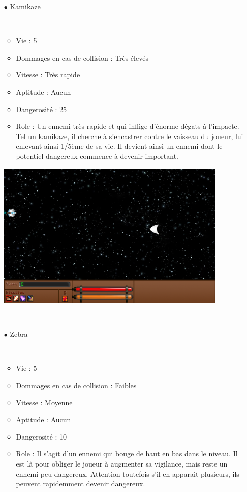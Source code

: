 \begin{itemize}
				\par~
			\item[$\bullet$ Kamikaze]
				\par~
				\begin{itemize}			
					\item Vie : 5
					\item Dommages en cas de collision : Très élevés
					\item Vitesse : Très rapide
					\item Aptitude : Aucun
					\item Dangerosité : 25%
					\item Role : Un ennemi très rapide et qui inflige d'énorme dégats à l'impacte. Tel un kamikaze, il cherche à s'encastrer contre le vaisseau du joueur, lui enlevant ainsi 1/5ème de sa vie. Il devient ainsi un ennemi dont le potentiel dangereux commence à devenir important.
				\end{itemize}
				\includegraphics[width=11cm]{images/vaisseaux/kamikaze.png}
				\par~
					\item[$\bullet$ Zebra]
				\par~
				\begin{itemize}
					\item Vie : 5
					\item Dommages en cas de collision : Faibles
					\item Vitesse : Moyenne
					\item Aptitude : Aucun
					\item Dangerosité : 10%
					\item Role : Il s'agit d'un ennemi qui bouge de haut en bas dans le niveau. Il est là pour obliger le joueur à augmenter sa vigilance, mais reste un ennemi peu dangereux. Attention toutefois s'il en apparait plusieurs, ils peuvent rapidemment devenir dangereux.
				\end{itemize}

\end{itemize}
